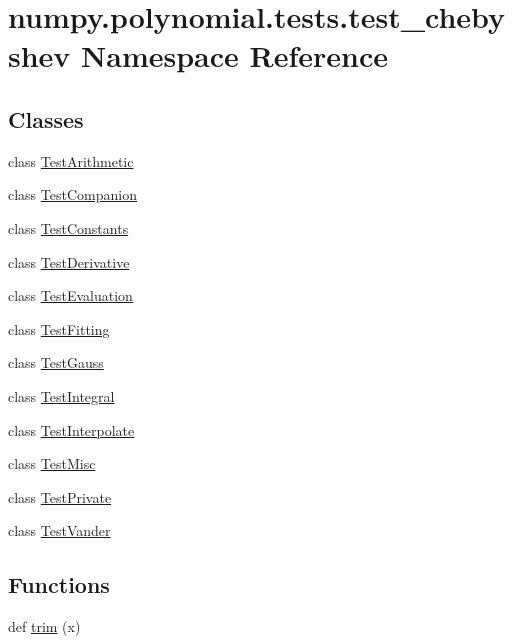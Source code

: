 \hypertarget{namespacenumpy_1_1polynomial_1_1tests_1_1test__chebyshev}{}\section{numpy.\+polynomial.\+tests.\+test\+\_\+chebyshev Namespace Reference}
\label{namespacenumpy_1_1polynomial_1_1tests_1_1test__chebyshev}
\subsection*{Classes}
\begin{DoxyCompactItemize}
\item 
class \hyperlink{classnumpy_1_1polynomial_1_1tests_1_1test__chebyshev_1_1TestArithmetic}{Test\+Arithmetic}
\item 
class \hyperlink{classnumpy_1_1polynomial_1_1tests_1_1test__chebyshev_1_1TestCompanion}{Test\+Companion}
\item 
class \hyperlink{classnumpy_1_1polynomial_1_1tests_1_1test__chebyshev_1_1TestConstants}{Test\+Constants}
\item 
class \hyperlink{classnumpy_1_1polynomial_1_1tests_1_1test__chebyshev_1_1TestDerivative}{Test\+Derivative}
\item 
class \hyperlink{classnumpy_1_1polynomial_1_1tests_1_1test__chebyshev_1_1TestEvaluation}{Test\+Evaluation}
\item 
class \hyperlink{classnumpy_1_1polynomial_1_1tests_1_1test__chebyshev_1_1TestFitting}{Test\+Fitting}
\item 
class \hyperlink{classnumpy_1_1polynomial_1_1tests_1_1test__chebyshev_1_1TestGauss}{Test\+Gauss}
\item 
class \hyperlink{classnumpy_1_1polynomial_1_1tests_1_1test__chebyshev_1_1TestIntegral}{Test\+Integral}
\item 
class \hyperlink{classnumpy_1_1polynomial_1_1tests_1_1test__chebyshev_1_1TestInterpolate}{Test\+Interpolate}
\item 
class \hyperlink{classnumpy_1_1polynomial_1_1tests_1_1test__chebyshev_1_1TestMisc}{Test\+Misc}
\item 
class \hyperlink{classnumpy_1_1polynomial_1_1tests_1_1test__chebyshev_1_1TestPrivate}{Test\+Private}
\item 
class \hyperlink{classnumpy_1_1polynomial_1_1tests_1_1test__chebyshev_1_1TestVander}{Test\+Vander}
\end{DoxyCompactItemize}
\subsection*{Functions}
\begin{DoxyCompactItemize}
\item 
def \hyperlink{namespacenumpy_1_1polynomial_1_1tests_1_1test__chebyshev_a05627da8658f27c85b81e9c812a2f521}{trim} (x)
\end{DoxyCompactItemize}
